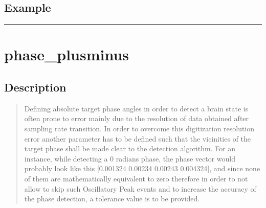 \documentclass[letterpaper,10pt,english]{sphinxmanual}
\begin{document}
\subsection{Example}
\label{\detokenize{4_api_documentation:id25}}
\begin{sphinxVerbatim}[commandchars=\\\{\}]
 
 
\end{sphinxVerbatim}


\bigskip\hrule\bigskip



\section{phase\_plusminus}
\label{\detokenize{4_api_documentation:phase-plusminus}}

\subsection{Description}
\label{\detokenize{4_api_documentation:id26}}\begin{quote}

Defining absolute target phase angles in order to detect a brain state is often prone to error mainly due to the resolution of data obtained after sampling rate transition. In order to overcome this digitization resolution error another parameter has to be defined such that the vicinities of the target phase shall be made clear to the detection algorithm. For an instance, while detecting a 0 radians phase, the phase vector would probably look like this {[}\sphinxhyphen{}0.001324 \sphinxhyphen{}0.00234 0.00243 0.004324{]}, and since none of them are mathematically equivalent to zero therefore in order to not allow to skip such Oscillatory Peak events and to increase the accuracy of the phase detection, a tolerance value is to be provided.
\end{quote}
\end{document}
